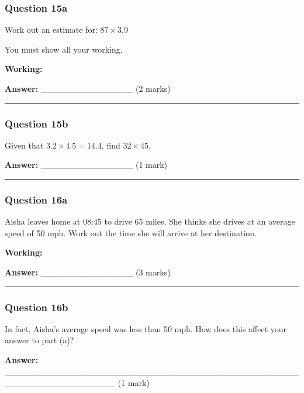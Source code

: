 \subsubsection{Question 15a}\label{question-15a}

Work out an estimate for: \(87 \times 3.9\)

You must show all your working.

\textbf{Working:}

\textbf{Answer:} \_\_\_\_\_\_\_\_\_\_\_\_\_\_\_ (2 marks)

\begin{center}\rule{0.5\linewidth}{0.5pt}\end{center}

\subsubsection{Question 15b}\label{question-15b}

Given that \(3.2 \times 4.5 = 14.4\), find \(32 \times 45\).

\textbf{Answer:} \_\_\_\_\_\_\_\_\_\_\_\_\_\_\_ (1 mark)

\begin{center}\rule{0.5\linewidth}{0.5pt}\end{center}

\subsubsection{Question 16a}\label{question-16a}

Aisha leaves home at 08:45 to drive 65 miles. She thinks she drives at
an average speed of 50 mph. Work out the time she will arrive at her
destination.

\textbf{Working:}

\textbf{Answer:} \_\_\_\_\_\_\_\_\_\_\_\_\_\_\_ (3 marks)

\begin{center}\rule{0.5\linewidth}{0.5pt}\end{center}

\subsubsection{Question 16b}\label{question-16b}

In fact, Aisha's average speed was less than 50 mph. How does this
affect your answer to part (a)?

\textbf{Answer:}
\_\_\_\_\_\_\_\_\_\_\_\_\_\_\_\_\_\_\_\_\_\_\_\_\_\_\_\_\_\_\_\_\_\_\_\_\_\_\_\_\_\_\_\_\_\_\_\_\_\_\_\_\_\_\_\_\_\_\_\_\_\_\_\_\_\_
(1 mark)

